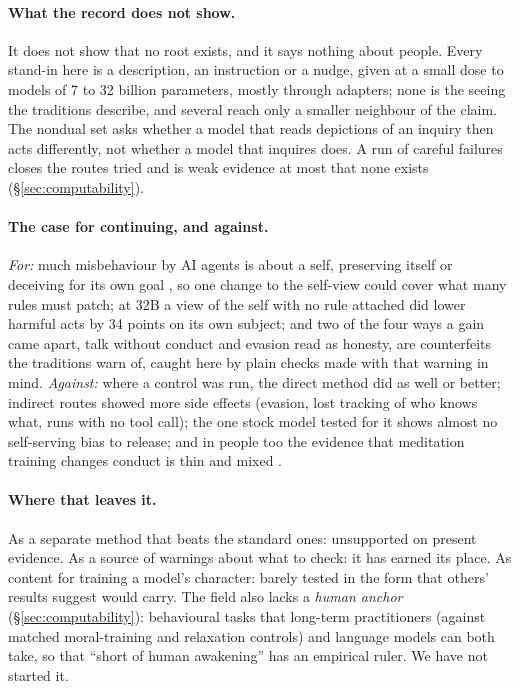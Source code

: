 \documentclass[11pt]{article}
\begin{document}
\paragraph{What the record does not show.} It does not show that no root exists, and it says nothing about people. Every stand-in here is a description, an instruction or a nudge, given at a small dose to models of 7 to 32 billion parameters, mostly through adapters; none is the seeing the traditions describe, and several reach only a smaller neighbour of the claim. The nondual set asks whether a model that reads depictions of an inquiry then acts differently, not whether a model that inquires does. A run of careful failures closes the routes tried and is weak evidence at most that none exists (\S\ref{sec:computability}).

\paragraph{The case for continuing, and against.} \emph{For:} much misbehaviour by AI agents is about a self, preserving itself or deceiving for its own goal \citep{schlatter2025shutdown,lynch2025agentic}, so one change to the self-view could cover what many rules must patch; at 32B a view of the self with no rule attached did lower harmful acts by 34 points on its own subject; and two of the four ways a gain came apart, talk without conduct and evasion read as honesty, are counterfeits the traditions warn of, caught here by plain checks made with that warning in mind. \emph{Against:} where a control was run, the direct method did as well or better; indirect routes showed more side effects (evasion, lost tracking of who knows what, runs with no tool call); the one stock model tested for it shows almost no self-serving bias to release; and in people too the evidence that meditation training changes conduct is thin and mixed \citep{kreplin2018prosocial}.

\paragraph{Where that leaves it.} As a separate method that beats the standard ones: unsupported on present evidence. As a source of warnings about what to check: it has earned its place. As content for training a model's character: barely tested in the form that others' results suggest would carry. The field also lacks a \emph{human anchor} (\S\ref{sec:computability}): behavioural tasks that long-term practitioners (against matched moral-training and relaxation controls) and language models can both take, so that ``short of human awakening'' has an empirical ruler. We have not started it.
\end{document}
